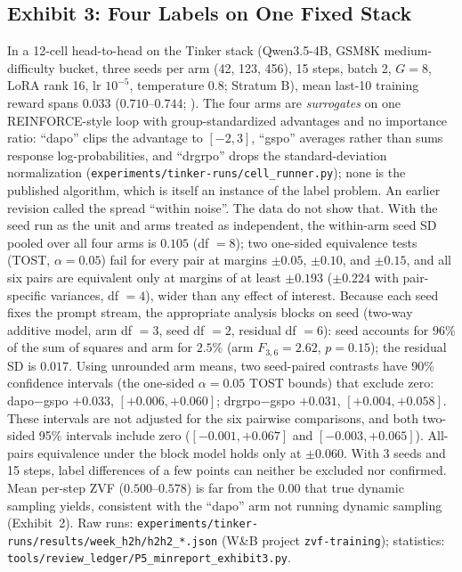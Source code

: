 \subsection{Exhibit 3: Four Labels on One Fixed Stack}
\label{sec:p5-exhibit-h2h}
In a 12-cell head-to-head on the Tinker stack (Qwen3.5-4B, GSM8K
medium-difficulty bucket, three seeds per arm (42, 123, 456), 15 steps, batch
2, $G{=}8$, LoRA rank 16, lr $10^{-5}$, temperature $0.8$; Stratum B), mean
last-10 training reward spans $0.033$ ($0.710$--$0.744$;
). The four arms are \emph{surrogates} on one
REINFORCE-style loop with group-standardized advantages and no importance
ratio: ``dapo'' clips the advantage to $[-2,3]$, ``gspo'' averages rather than
sums response log-probabilities, and ``drgrpo'' drops the standard-deviation
normalization (\texttt{experiments/tinker-runs/cell\_runner.py}); none is the
published algorithm, which is itself an instance of the label problem. An
earlier revision called the spread ``within noise''. The data do not show
that. With the seed run as the unit and arms treated as independent, the
within-arm seed SD pooled over all four arms is $0.105$ (df $=8$); two
one-sided equivalence tests (TOST, $\alpha=0.05$) fail for every pair at
margins $\pm0.05$, $\pm0.10$, and $\pm0.15$, and all six pairs are equivalent
only at margins of at least $\pm0.193$ ($\pm0.224$ with pair-specific variances,
df $=4$), wider than any effect of interest. Because each seed fixes the prompt
stream, the appropriate analysis blocks on seed (two-way additive model, arm
df $=3$, seed df $=2$, residual df $=6$): seed accounts for $96\%$ of the sum
of squares and arm for $2.5\%$ (arm $F_{3,6}=2.62$, $p=0.15$); the residual
SD is $0.017$. Using unrounded arm means, two seed-paired contrasts have 90\%
confidence intervals (the one-sided $\alpha=0.05$ TOST bounds) that exclude
zero: dapo$-$gspo $+0.033$, $[+0.006,+0.060]$; drgrpo$-$gspo $+0.031$,
$[+0.004,+0.058]$. These intervals are not adjusted for the six pairwise
comparisons, and both two-sided 95\% intervals include zero
($[-0.001,+0.067]$ and $[-0.003,+0.065]$). All-pairs equivalence under the
block model holds only at $\pm0.060$. With 3 seeds and 15 steps, label
differences of a few points can neither be excluded nor confirmed. Mean
per-step ZVF ($0.500$--$0.578$) is far from the $0.00$ that true dynamic
sampling yields, consistent with the ``dapo'' arm not running dynamic sampling
(Exhibit~2). Raw runs:
\texttt{experiments/tinker-runs/results/week\_h2h/h2h2\_*.json} (W\&B project
\texttt{zvf-training}); statistics:
\texttt{tools/review\_ledger/P5\_minreport\_exhibit3.py}.

